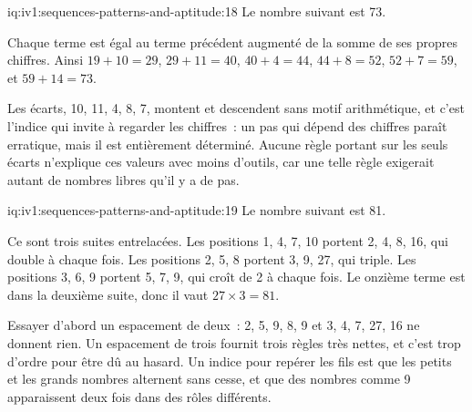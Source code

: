 \begin{solution}{iq:iv1:sequences-patterns-and-aptitude:18}
Le nombre suivant est 73.

Chaque terme est égal au terme précédent augmenté de la somme de ses propres chiffres. Ainsi $19 + 10 = 29$, $29 + 11 = 40$, $40 + 4 = 44$, $44 + 8 = 52$, $52 + 7 = 59$, et $59 + 14 = 73$.

Les écarts, 10, 11, 4, 8, 7, montent et descendent sans motif arithmétique, et c'est l'indice qui invite à regarder les chiffres~: un pas qui dépend des chiffres paraît erratique, mais il est entièrement déterminé. Aucune règle portant sur les seuls écarts n'explique ces valeurs avec moins d'outils, car une telle règle exigerait autant de nombres libres qu'il y a de pas.

\end{solution}

\begin{solution}{iq:iv1:sequences-patterns-and-aptitude:19}
Le nombre suivant est 81.

Ce sont trois suites entrelacées. Les positions 1, 4, 7, 10 portent 2, 4, 8, 16, qui double à chaque fois. Les positions 2, 5, 8 portent 3, 9, 27, qui triple. Les positions 3, 6, 9 portent 5, 7, 9, qui croît de 2 à chaque fois. Le onzième terme est dans la deuxième suite, donc il vaut $27 \times 3 = 81$.

Essayer d'abord un espacement de deux~: 2, 5, 9, 8, 9 et 3, 4, 7, 27, 16 ne donnent rien. Un espacement de trois fournit trois règles très nettes, et c'est trop d'ordre pour être dû au hasard. Un indice pour repérer les fils est que les petits et les grands nombres alternent sans cesse, et que des nombres comme 9 apparaissent deux fois dans des rôles différents.

\end{solution}


